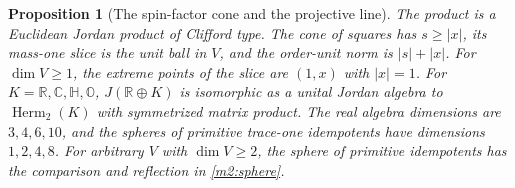\documentclass[11pt,reqno]{amsart}
\newtheorem{proposition}[theorem]{Proposition}
\theoremstyle{definition}
\theoremstyle{remark}
\numberwithin{equation}{section}
\newcommand{\R}{\mathbb{R}}
\newcommand{\C}{\mathbb{C}}
\newcommand{\HH}{\mathbb{H}}
\begin{document}
\begin{proposition}[The spin-factor cone and the projective line]\label{m10:spin-geometry}
The product is a Euclidean Jordan product of Clifford type. The
cone of squares has \(s\ge |x|\), its mass-one slice is the unit
ball in \(V\), and the order-unit norm is \(|s|+|x|\).
For \(\dim V\ge 1\), the extreme points of the slice are
\((1,x)\) with \(|x|=1\). For \(K=\R,\C,\HH,\mathbb O\),
\(J(\R\oplus K)\) is isomorphic as a unital Jordan algebra to
\(\operatorname{Herm}_2(K)\) with symmetrized matrix product.
The real algebra dimensions are \(3,4,6,10\), and the spheres of
primitive trace-one idempotents have dimensions \(1,2,4,8\).
For arbitrary \(V\) with \(\dim V\ge2\), the sphere of primitive
idempotents has the comparison and reflection in
\eqref{m2:sphere}.
\end{proposition}
\end{document}

